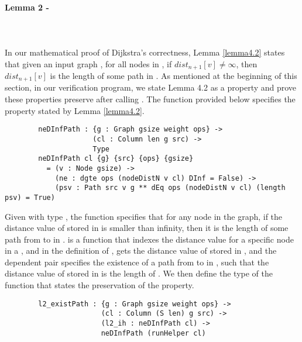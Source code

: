 \paragraph{Lemma 2 - } \label{lemma2V}
\tab\\\\
In our mathematical proof of Dijkstra's correctness, Lemma \ref{lemma4.2} states that given an input graph , for all nodes  in , if $dist_{n+1}[v] \neq \infty$, then $dist_{n+1}[v]$ is the length of some  path in . As mentioned at the beginning of this section, in our verification program, we state Lemma 4.2 as a  property and prove these properties preserve after calling . The function  provided below specifies the  property stated by Lemma \ref{lemma4.2}.
\begin{lstlisting}
		neDInfPath : {g : Graph gsize weight ops} ->
		             (cl : Column len g src) ->
		             Type
		neDInfPath cl {g} {src} {ops} {gsize}
		  = (v : Node gsize) ->
		    (ne : dgte ops (nodeDistN v cl) DInf = False) ->
		    (psv : Path src v g ** dEq ops (nodeDistN v cl) (length psv) = True)
\end{lstlisting}
 
Given  with type , the function  specifies that for any node  in the graph, if the distance value of  stored in  is smaller than infinity, then it is the length of some path from  to  in .  is a function that indexes the distance value for a specific node in a , and in the definition of ,  gets the distance value of  stored in , and the dependent pair  specifies the existence of a path  from  to  in , such that the distance value of  stored in  is the length of . We then define the type of the function  that states the preservation of the  property. 
\begin{lstlisting}
		l2_existPath : {g : Graph gsize weight ops} ->
		               (cl : Column (S len) g src) ->
		               (l2_ih : neDInfPath cl) ->
		               neDInfPath (runHelper cl)
\end{lstlisting}

